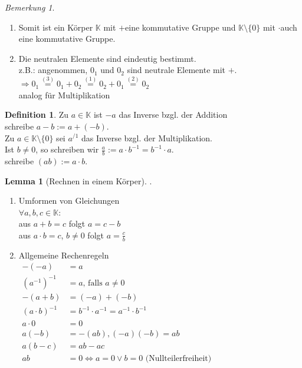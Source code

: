 \documentclass[12pt,a4paper,titlepage]{article} %
\theoremstyle{definition}
\newtheorem{lem}[satz]{Lemma}
\newtheorem{defi}[satz]{Definition}
\theoremstyle{remark}
\newtheorem*{bem}{Bemerkung}
\begin{document}
\begin{bem}
	\begin{enumerate}.%
		\item Somit ist ein Körper $\mathbb{K}$ mit \glqq $+$\grqq eine kommutative Gruppe und $\mathbb{K} \setminus \{0\}$ mit \glqq $\cdot$\grqq auch eine kommutative Gruppe.
		\item Die neutralen Elemente sind eindeutig bestimmt.\\
		z.B.: angenommen, $0_1$ und $0_2$ sind neutrale Elemente mit \glqq $+$\grqq .\\
		$\Rightarrow 0_1 \overset{(3)}{=} 0_1 + 0_2 \overset{(1)}{=} 0_2 + 0_1 \overset{(2)}{=} 0_2$\\
		analog für Multiplikation
	\end{enumerate}
\end{bem}
\begin{defi}
	Zu $a\in \mathbb{K}$ ist $-a$ das Inverse bzgl. der Addition\\
	schreibe $a-b := a + (-b)$.\\
	Zu $a\in\mathbb{K}\setminus\{0\}$ sei $a^{/1}$ das Inverse bzgl. der Multiplikation.\\
	Ist $b\neq 0$, so schreiben wir $\frac{a}{b} := a\cdot b^{-1} =b^{-1}\cdot a$.\\
	schreibe $(ab) := a\cdot b$.
\end{defi}
\begin{lem}[Rechnen in einem Körper].%
	\begin{enumerate}
	\item Umformen von Gleichungen\\
	$\forall a,b,c\in\mathbb{K}:$\\
	aus $a+b=c$ folgt $a=c-b$\\
	aus $a\cdot b=c$, $b\neq 0$ folgt $a=\frac{c}{b}$
	\item Allgemeine Rechenregeln\\
	$\begin{aligned}
		-(-a) &= a\\
		(a^{-1})^{-1}&=a\text{, falls }a\neq 0\\
		-(a+b) &= (-a) + (-b)\\
		(a\cdot b)^{-1}&=b^{-1}\cdot a^{-1}=a^{-1}\cdot b^{-1}\\
		a\cdot 0&=0\\
		a(-b)&=-(ab), (-a)(-b)=ab\\
		a(b-c) &= ab - ac\\
		ab &= 0 \Leftrightarrow a = 0 \vee b = 0 \text{ (Nullteilerfreiheit)}\\ 
	\end{aligned}$
	\end{enumerate}
\end{lem}
\end{document}
